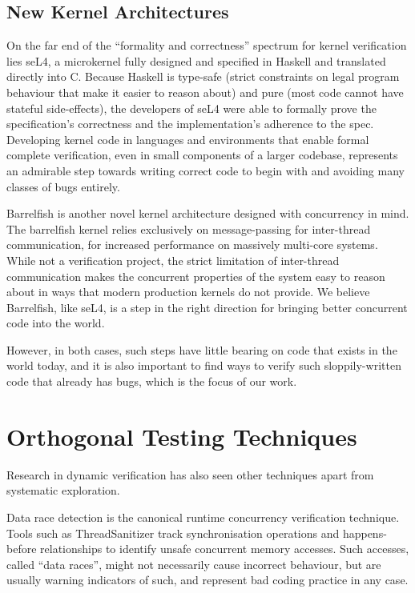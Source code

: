 \subsection{New Kernel Architectures}

On the far end of the ``formality and correctness'' spectrum for kernel verification lies seL4\hspace{0in}\cite{sel4}, a microkernel fully designed and specified in Haskell and translated directly into C. Because Haskell is type-safe (strict constraints on legal program behaviour that make it easier to reason about) and pure (most code cannot have stateful side-effects), the developers of seL4 were able to formally prove the specification's correctness and the implementation's adherence to the spec.
Developing kernel code in languages and environments that enable formal complete verification, even in small components of a larger codebase, represents an admirable step towards writing correct code to begin with and avoiding many classes of bugs entirely.

Barrelfish\cite{barrelfish} is another novel kernel architecture designed with concurrency in mind. The barrelfish kernel relies exclusively on message-passing for inter-thread communication, for increased performance on massively multi-core systems. While not a verification project, the strict limitation of inter-thread communication makes the concurrent properties of the system easy to reason about in ways that modern production kernels do not provide.
We believe Barrelfish, like seL4, is a step in the right direction for bringing better concurrent code into the world.

However, in both cases, such steps have little bearing on code that exists in the world today, and it is also important to find ways to verify such sloppily-written code that already has bugs, which is the focus of our work.

\section{Orthogonal Testing Techniques}

Research in dynamic verification has also seen other techniques apart from systematic exploration.

Data race detection is the canonical runtime concurrency verification technique. Tools such as ThreadSanitizer\cite{tsan} track synchronisation operations and happens-before relationships to identify unsafe concurrent memory accesses. Such accesses, called ``data races'', might not necessarily cause incorrect behaviour, but are usually warning indicators of such, and represent bad coding practice in any case.

